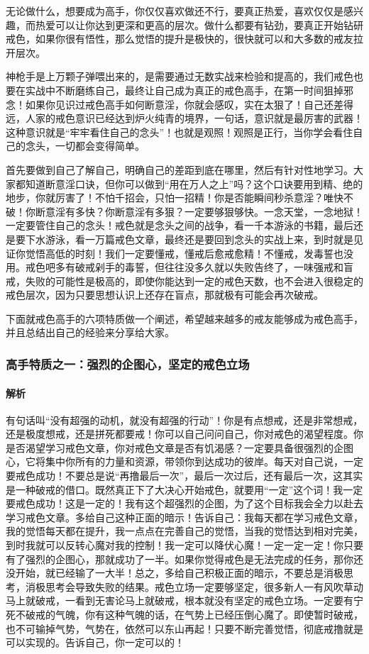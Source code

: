 \documentclass{ctexart}
\begin{document}
无论做什么，想要成为高手，你仅仅喜欢做还不行，要真正热爱，喜欢仅仅是感兴趣，而热爱可以让你达到更深和更高的层次。做什么都要有钻劲，要真正开始钻研戒色，如果你很有悟性，那么觉悟的提升是极快的，很快就可以和大多数的戒友拉开层次。

神枪手是上万颗子弹喂出来的，是需要通过无数实战来检验和提高的，我们戒色也要在实战中不断磨练自己，最终让自己成为真正的戒色高手，在第一时间狙掉邪念！如果你见识过戒色高手如何断意淫，你就会感叹，实在太狠了！自己还差得远，人家的戒色意识已经达到炉火纯青的境界，一句话，意识就是最厉害的武器！这种意识就是“牢牢看住自己的念头”！也就是观照！观照是正行，当你学会看住自己的念头，一切都会变得简单。

首先要做到自己了解自己，明确自己的差距到底在哪里，然后有针对性地学习。大家都知道断意淫口诀，但你可以做到“用在万人之上”吗？这个口诀要用到精、绝的地步，你就厉害了！不怕千招会，只怕一招精！你是否能瞬间秒杀意淫？唯快不破！你断意淫有多快？你断意淫有多狠？一定要够狠够快。一念天堂，一念地狱！一定要管住自己的念头！戒色就是念头之间的战争，看一千本游泳的书籍，最后还是要下水游泳，看一万篇戒色文章，最终还是要回到念头的实战上来，到时就是见证你觉悟高低的时刻！我们一定要懂戒，懂戒后愈戒愈精！不懂戒，发毒誓也没用。戒色吧多有破戒剁手的毒誓，但往往没多久就以失败告终了，一味强戒和盲戒，失败的可能性是极高的，即使你能达到一定的戒色天数，也不会进入很稳定的戒色层次，因为只要思想认识上还存在盲点，那就极有可能会再次破戒。

下面就戒色高手的六项特质做一个阐述，希望越来越多的戒友能够成为戒色高手，并且总结出自己的经验来分享给大家。

\subsubsection{高手特质之一：强烈的企图心，坚定的戒色立场}

\paragraph{解析} 有句话叫“没有超强的动机，就没有超强的行动”！你是有点想戒，还是非常想戒，还是极度想戒，还是拼死都要戒！你可以自己问问自己，你对戒色的渴望程度。你是否渴望学习戒色文章，你对戒色文章是否有饥渴感？一定要具备很强烈的企图心，它将集中你所有的力量和资源，带领你到达成功的彼岸。每天对自己说，一定要戒色成功！不要总是说“再撸最后一次”，最后一次过后，还有最后一次，这其实是一种破戒的借口。既然真正下了大决心开始戒色，就要用“一定”这个词！我一定要戒色成功！这是一定的！我有这个超强烈的企图，为了这个目标我会全力以赴去学习戒色文章。多给自己这种正面的暗示！告诉自己：我每天都在学习戒色文章，我的觉悟每天都在提升，我一点点在完善自己的觉悟，当我的觉悟达到相对完美，到时我就可以反转心魔对我的控制！我一定可以降伏心魔！一定一定一定！你只要有了强烈的企图心，那就成功了一半。如果你觉得戒色是无法完成的任务，那你还没开始，就已经输了一大半！总之，多给自己积极正面的暗示，不要总是消极思考，消极思考会导致失败的结果。戒色立场一定要够坚定，很多新人一有风吹草动马上就破戒，一看到无害论马上就破戒，根本就没有坚定的戒色立场。一定要有宁死不破戒的气魄，你有这种气魄的话，在气势上已经压倒心魔了。即使暂时破戒，也不可输掉气势，气势在，依然可以东山再起！只要不断完善觉悟，彻底戒撸就是可以实现的。告诉自己，你一定可以的！
\end{document}
